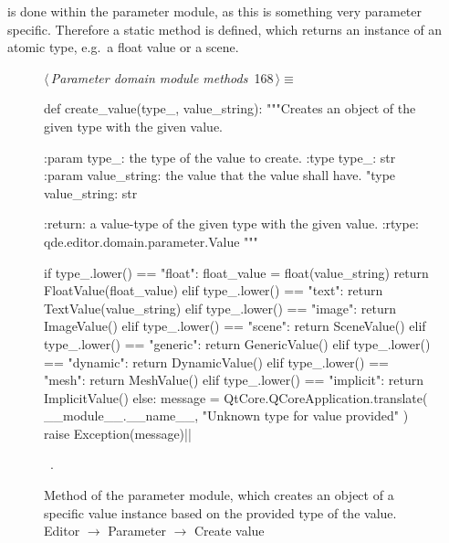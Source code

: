 \documentclass[%
    a4paper,    %
    justified,  %
    nobib,      %
    openany     %
]{tufte-book}
\makeatletter
\renewcommand{\label}[1]{\@tufte@label{##1}}%
\makeatother
\begin{document}
 is done within the
parameter module, as this is something very parameter specific. Therefore a
static method is defined, which returns an instance of an atomic type, e.g.\ a
float value or a scene.

\begin{figure}[!htbp]
\begin{flushleft} \small
\begin{minipage}{\linewidth}\label{scrap135}\raggedright\small
{} $\langle\,${\itshape Parameter domain module methods}\nobreak\ {\footnotesize {168}}$\,\rangle\equiv$
\vspace{-1ex}
\begin{pythoncode}
def create_value(type_, value_string):
    """Creates an object of the given type with the given value.

    :param type_: the type of the value to create.
    :type  type_: str
    :param value_string: the value that the value shall have.
    "type  value_string: str

    :return: a value-type of the given type with the given value.
    :rtype: qde.editor.domain.parameter.Value
    """

    if type_.lower() == "float":
        float_value = float(value_string)
        return FloatValue(float_value)
    elif type_.lower() == "text":
        return TextValue(value_string)
    elif type_.lower() == "image":
        return ImageValue()
    elif type_.lower() == "scene":
        return SceneValue()
    elif type_.lower() == "generic":
        return GenericValue()
    elif type_.lower() == "dynamic":
        return DynamicValue()
    elif type_.lower() == "mesh":
        return MeshValue()
    elif type_.lower() == "implicit":
        return ImplicitValue()
    else:
        message = QtCore.QCoreApplication.translate(
            __module__.__name__, "Unknown type for value provided"
        )
        raise Exception(message)|\NWsep|
\end{pythoncode}
\vspace{1.5ex}
\footnotesize
\begin{list}{}{\setlength{\itemsep}{-\parsep}\setlength{\itemindent}{-\leftmargin}}
\item \NWtxtMacroRefIn\ .

\item{}
\end{list}
\end{minipage}\vspace{4ex}
\end{flushleft}
\caption{Method of the parameter module, which creates an object of a specific
  value instance based on the provided type of the value.
  \newline{}\newline{}Editor $\rightarrow$ Parameter $\rightarrow$
  Create value}
\end{figure}
\end{document}
